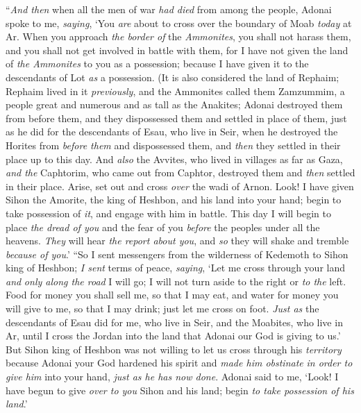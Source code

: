\begin{biblechapter}
\verse “\textit{And then} when all the men of war \textit{had died} from among the people,
\verse Adonai spoke to me, \textit{saying},
\verse ‘You \textit{are} about to cross over the boundary of Moab \textit{today} at Ar.
\verse When you approach \textit{the border of} the \textit{Ammonites}, you shall not harass them, and you shall not get involved in battle with them, for I have not given the land of \textit{the Ammonites} to you as a possession; because I have given it to the descendants of Lot \textit{as} a possession.
\verse (It is also considered the land of Rephaim; Rephaim lived in it \textit{previously}, and the Ammonites called them Zamzummim,
\verse a people great and numerous and as tall as the Anakites; Adonai destroyed them from before them, and they dispossessed them and settled in place of them,
\verse just as he did for the descendants of Esau, who live in Seir, when he destroyed the Horites from \textit{before them} and dispossessed them, and \textit{then} they settled in their place up to this day.
\verse And \textit{also} the Avvites, who lived in villages as far as Gaza, \textit{and the} Caphtorim, who came out from Caphtor, destroyed them and \textit{then} settled in their place.
\verse Arise, set out and cross \textit{over} the wadi of Arnon. Look! I have given Sihon the Amorite, the king of Heshbon, and his land into your hand; begin to take possession of \textit{it}, and engage with him in battle.
\verse This day I will begin to place \textit{the dread of you} and the fear of you \textit{before} the peoples under all the heavens. \textit{They} will hear \textit{the report about you}, and \textit{so} they will shake and tremble \textit{because of you}.’ 
\verse “So I sent messengers from the wilderness of Kedemoth to Sihon king of Heshbon; \textit{I sent} terms of peace, \textit{saying},
\verse ‘Let me cross through your land \textit{and} \textit{only along the road} I will go; I will not turn aside to the right or \textit{to the} left.
\verse Food for money you shall sell me, so that I may eat, and water for money you will give to me, so that I may drink; just let me cross on foot.
\verse \textit{Just as} the descendants of Esau did for me, who live in Seir, and the Moabites, who live in Ar, until I cross the Jordan into the land that Adonai our God is giving to us.’
\verse But Sihon king of Heshbon was not willing to let us cross through his \textit{territory} because Adonai your God hardened his spirit and \textit{made him obstinate} \textit{in order to give him} into your hand, \textit{just as he has now done}.
\verse Adonai said to me, ‘Look! I have begun to give \textit{over to you} Sihon and his land; begin \textit{to take possession of his land}.’

\end{biblechapter}
